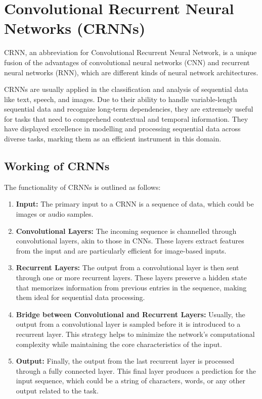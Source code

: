 \newpage
\section{Convolutional Recurrent Neural Networks (CRNNs)}

CRNN, an abbreviation for Convolutional Recurrent Neural Network, is a unique fusion of the advantages of convolutional neural networks (CNN) and recurrent neural networks (RNN), which are different kinds of neural network architectures.

CRNNs are usually applied in the classification and analysis of sequential data like text, speech, and images. Due to their ability to handle variable-length sequential data and recognize long-term dependencies, they are extremely useful for tasks that need to comprehend contextual and temporal information. They have displayed excellence in modelling and processing sequential data across diverse tasks, marking them as an efficient instrument in this domain.\cite{vermaImprovementOCRTechnologies2022}

\subsection{Working of CRNNs}
The functionality of CRNNs is outlined as follows:

\begin{enumerate}
    \item \textbf{Input:} The primary input to a CRNN is a sequence of data, which could be images or audio samples.
    \item \textbf{Convolutional Layers:} The incoming sequence is channelled through convolutional layers, akin to those in CNNs. These layers extract features from the input and are particularly efficient for image-based inputs.
    \item \textbf{Recurrent Layers:} The output from a convolutional layer is then sent through one or more recurrent layers. These layers preserve a hidden state that memorizes information from previous entries in the sequence, making them ideal for sequential data processing.
    \item \textbf{Bridge between Convolutional and Recurrent Layers:} Usually, the output from a convolutional layer is sampled before it is introduced to a recurrent layer. This strategy helps to minimize the network's computational complexity while maintaining the core characteristics of the input.
    \item \textbf{Output:} Finally, the output from the last recurrent layer is processed through a fully connected layer. This final layer produces a prediction for the input sequence, which could be a string of characters, words, or any other output related to the task.
\end{enumerate}

